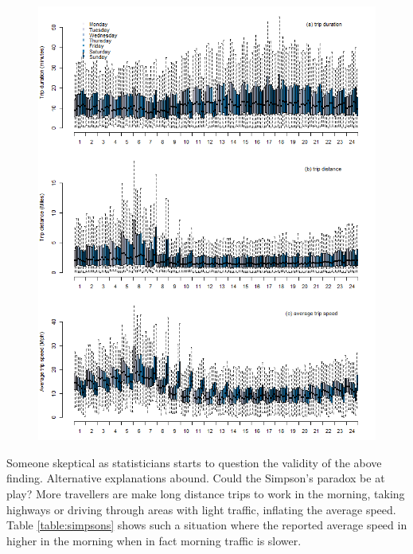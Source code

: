 \documentclass[10pt,a4paper]{article} %
\begin{document}
{    \begin{figure}
    \centering
        \includegraphics[width=\linewidth]{daily-hourly.png}
        \label{fig:trip-by-dayhours}
    \end{figure}
    
    Someone skeptical as statisticians starts to question the validity of the above finding. Alternative explanations abound. Could the Simpson's paradox be at play? More travellers are make long distance trips to work in the morning, taking highways or driving through areas with light traffic, inflating the average speed. Table \ref{table:simpsons} shows such a situation where the reported average speed in higher in the morning when in fact morning traffic is slower. 
    
}
\end{document}
